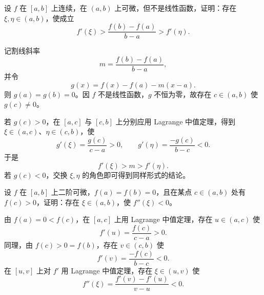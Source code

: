 \begin{xreferenceproblem}[7]
设 $f$ 在 $[a,b]$ 上连续，在 $(a,b)$ 上可微，但不是线性函数，证明：存在 $\xi,\eta\in(a,b)$，使成立
\[
  f'(\xi)>\frac{f(b)-f(a)}{b-a}>f'(\eta).
\]
\end{xreferenceproblem}
\begin{xsolution}
记割线斜率
\[
  m=\frac{f(b)-f(a)}{b-a},
\]
并令
\[
  g(x)=f(x)-f(a)-m(x-a).
\]
则 $g(a)=g(b)=0$。因 $f$ 不是线性函数，$g$ 不恒为零，故存在 $c\in(a,b)$ 使 $g(c)\neq0$。

若 $g(c)>0$，在 $[a,c]$ 与 $[c,b]$ 上分别应用 Lagrange 中值定理，得到 $\xi\in(a,c)$、$\eta\in(c,b)$，使
\[
  g'(\xi)=\frac{g(c)}{c-a}>0,
  \qquad
  g'(\eta)=\frac{-g(c)}{b-c}<0.
\]
于是
\[
  f'(\xi)>m>f'(\eta).
\]
若 $g(c)<0$，交换 $\xi,\eta$ 的角色即可得到同样形式的结论。
\end{xsolution}


\begin{xreferenceproblem}[8]
设 $f$ 在 $[a,b]$ 上二阶可微，$f(a)=f(b)=0$，且在某点 $c\in(a,b)$ 处有 $f(c)>0$，证明：存在 $\xi\in(a,b)$，使 $f''(\xi)<0$。
\end{xreferenceproblem}
\begin{xsolution}
由 $f(a)=0<f(c)$，在 $[a,c]$ 上用 Lagrange 中值定理，存在 $u\in(a,c)$ 使
\[
  f'(u)=\frac{f(c)}{c-a}>0.
\]
同理，由 $f(c)>0=f(b)$，存在 $v\in(c,b)$ 使
\[
  f'(v)=\frac{-f(c)}{b-c}<0.
\]
在 $[u,v]$ 上对 $f'$ 用 Lagrange 中值定理，存在 $\xi\in(u,v)$ 使
\[
  f''(\xi)=\frac{f'(v)-f'(u)}{v-u}<0.
\]
\end{xsolution}


